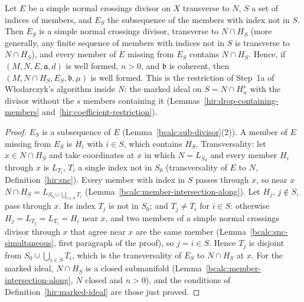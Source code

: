 \begin{lemma}
\label{bcalc:member-intersection-drop-along}
\mixedleanok
Let \(E\) be a simple normal crossings divisor on \(X\) transverse to \(N\), \(S\) a set of indices of members, and \(E_S\) the subsequence of the
members with index not in \(S\). Then \(E_S\) is a simple normal crossings divisor, transverse to \(N\cap H_S\) (more generally, any finite sequence of
members with indices not in \(S\) is transverse to \(N\cap H_S\)), and every member of \(E\) missing from \(E_S\) contains \(N\cap H_S\). Hence, if
\((M,N,E,\mathfrak a,d)\) is well formed, \(n>0\), and \(\mathfrak b\) is coherent, then \((M,N\cap H_S,E_S,\mathfrak b,\mu)\) is well formed. This is the
restriction of Step~1a of Włodarczyk's algorithm inside \(N\): the marked ideal on \(S=N\cap H^s_\alpha\) with the divisor without the \(s\) members
containing it (Lemmas~\ref{hir:drop-containing-members} and~\ref{hir:coefficient-restriction}).
\end{lemma}
\begin{proof}
\mixedleanok
\(E_S\) is a subsequence of \(E\) (Lemma~\ref{bcalc:sub-divisor}(2)). A member of \(E\) missing from \(E_S\) is \(H_i\) with \(i\in S\), which contains \(H_S\).
Transversality: let \(x\in N\cap H_S\) and take coordinates at \(x\) in which \(N=L_{S_0}\) and every member \(H_i\) through \(x\) is \(L_{T_i}\), \(T_i\) a single
index not in \(S_0\) (transversality of \(E\) to \(N\), Definition~\ref{hir:snc}). Every member with index in \(S\) passes through \(x\), so near \(x\)
\(N\cap H_S=L_{S_0\cup\bigcup_{i\in S}T_i}\) (Lemma~\ref{bcalc:member-intersection-along}). Let \(H_j\), \(j\notin S\), pass through \(x\). Its index \(T_j\) is
not in \(S_0\); and \(T_j\ne T_i\) for \(i\in S\): otherwise \(H_j=L_{T_j}=L_{T_i}=H_i\) near \(x\), and two members of a simple normal crossings divisor
through \(x\) that agree near \(x\) are the same member (Lemma~\ref{bcalc:snc-simultaneous}, first paragraph of the proof), so \(j=i\in S\). Hence
\(T_j\) is disjoint from \(S_0\cup\bigcup_{i\in S}T_i\), which is the transversality of \(E_S\) to \(N\cap H_S\) at \(x\). For the marked ideal,
\(N\cap H_S\) is a closed submanifold (Lemma~\ref{bcalc:member-intersection-along}, \(N\) closed and \(n>0\)), and the conditions of
Definition~\ref{hir:marked-ideal} are those just proved.
\end{proof}

